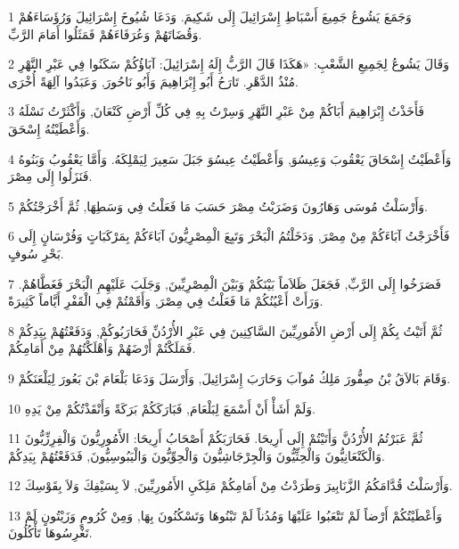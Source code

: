 \par 1 وَجَمَعَ يَشُوعُ جَمِيعَ أَسْبَاطِ إِسْرَائِيلَ إِلَى شَكِيمَ. وَدَعَا شُيُوخَ إِسْرَائِيلَ وَرُؤَسَاءَهُمْ وَقُضَاتَهُمْ وَعُرَفَاءَهُمْ فَمَثَلُوا أَمَامَ الرَّبِّ.
\par 2 وَقَالَ يَشُوعُ لِجَمِيعِ الشَّعْبِ: «هَكَذَا قَالَ الرَّبُّ إِلَهُ إِسْرَائِيلَ: آبَاؤُكُمْ سَكَنُوا فِي عَبْرِ النَّهْرِ مُنْذُ الدَّهْرِ. تَارَحُ أَبُو إِبْرَاهِيمَ وَأَبُو نَاحُورَ, وَعَبَدُوا آلِهَةً أُخْرَى.
\par 3 فَأَخَذْتُ إِبْرَاهِيمَ أَبَاكُمْ مِنْ عَبْرِ النَّهْرِ وَسِرْتُ بِهِ فِي كُلِّ أَرْضِ كَنْعَانَ, وَأَكْثَرْتُ نَسْلَهُ وَأَعْطَيْتُهُ إِسْحَقَ.
\par 4 وَأَعْطَيْتُ إِسْحَاقَ يَعْقُوبَ وَعِيسُوَ, وَأَعْطَيْتُ عِيسُوَ جَبَلَ سَعِيرَ لِيَمْلِكَهُ. وَأَمَّا يَعْقُوبُ وَبَنُوهُ فَنَزَلُوا إِلَى مِصْرَ.
\par 5 وَأَرْسَلْتُ مُوسَى وَهَارُونَ وَضَرَبْتُ مِصْرَ حَسَبَ مَا فَعَلْتُ فِي وَسَطِهَا, ثُمَّ أَخْرَجْتُكُمْ.
\par 6 فَأَخْرَجْتُ آبَاءَكُمْ مِنْ مِصْرَ, وَدَخَلْتُمُ الْبَحْرَ وَتَبِعَ الْمِصْرِيُّونَ آبَاءَكُمْ بِمَرْكَبَاتٍ وَفُرْسَانٍ إِلَى بَحْرِ سُوفٍ.
\par 7 فَصَرَخُوا إِلَى الرَّبِّ, فَجَعَلَ ظَلاَماً بَيْنَكُمْ وَبَيْنَ الْمِصْرِيِّينَ, وَجَلَبَ عَلَيْهِمِ الْبَحْرَ فَغَطَّاهُمْ. وَرَأَتْ أَعْيُنُكُمْ مَا فَعَلْتُ فِي مِصْرَ, وَأَقَمْتُمْ فِي الْقَفْرِ أَيَّاماً كَثِيرَةً.
\par 8 ثُمَّ أَتَيْتُ بِكُمْ إِلَى أَرْضِ الأَمُورِيِّينَ السَّاكِنِينَ فِي عَبْرِ الأُرْدُنِّ فَحَارَبُوكُمْ, وَدَفَعْتُهُمْ بِيَدِكُمْ فَمَلَكْتُمْ أَرْضَهُمْ وَأَهْلَكْتُهُمْ مِنْ أَمَامِكُمْ.
\par 9 وَقَامَ بَالاَقُ بْنُ صِفُّورَ مَلِكُ مُوآبَ وَحَارَبَ إِسْرَائِيلَ, وَأَرْسَلَ وَدَعَا بَلْعَامَ بْنَ بَعُورَ لِيَلْعَنَكُمْ.
\par 10 وَلَمْ أَشَأْ أَنْ أَسْمَعَ لِبَلْعَامَ, فَبَارَكَكُمْ بَرَكَةً وَأَنْقَذْتُكُمْ مِنْ يَدِهِ.
\par 11 ثُمَّ عَبَرْتُمُ الأُرْدُنَّ وَأَتَيْتُمْ إِلَى أَرِيحَا. فَحَارَبَكُمْ أَصْحَابُ أَرِيحَا: الأَمُورِيُّونَ وَالْفِرِزِّيُّونَ وَالْكَنْعَانِيُّونَ وَالْحِثِّيُّونَ وَالْجِرْجَاشِيُّونَ وَالْحِوِّيُّونَ وَالْيَبُوسِيُّونَ, فَدَفَعْتُهُمْ بِيَدِكُمْ.
\par 12 وَأَرْسَلْتُ قُدَّامَكُمُ الزَّنَابِيرَ وَطَرَدْتُ مِنْ أَمَامِكُمْ مَلِكَيِ الأَمُورِيِّينَ, لاَ بِسَيْفِكَ وَلاَ بِقَوْسِكَ.
\par 13 وَأَعْطَيْتُكُمْ أَرْضاً لَمْ تَتْعَبُوا عَلَيْهَا وَمُدُناً لَمْ تَبْنُوهَا وَتَسْكُنُونَ بِهَا, وَمِنْ كُرُومٍ وَزَيْتُونٍ لَمْ تَغْرِسُوهَا تَأْكُلُونَ.
